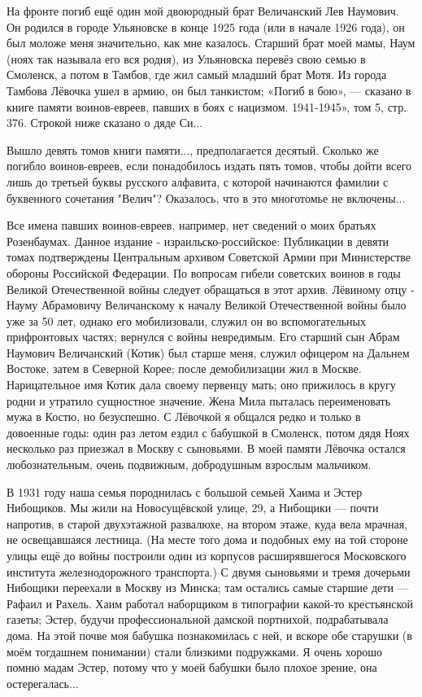 На фронте погиб ещё один мой двоюродный брат Величанский Лев Наумович. Он родился в городе Ульяновске в конце 1925 года (или в начале 1926 года), он был моложе меня значительно, как мне казалось. Старший брат моей мамы, Наум (ноях так называла его вся родня), из Ульяновска перевёз свою семью в Смоленск, а потом в Тамбов, где жил самый младший брат Мотя. Из города Тамбова Лёвочка ушел в армию, он был танкистом; «Погиб в бою», — сказано в книге памяти воинов-евреев, павших в боях с нацизмом. 1941-1945», том 5, стр. 376. Строкой ниже сказано о дяде Си...

Вышло девять томов книги памяти..., предполагается десятый. Сколько же погибло воинов-евреев, если понадобилось издать пять томов, чтобы дойти всего лишь до третьей буквы русского алфавита, с которой начинаются фамилии с буквенного сочетания "Велич"? Оказалось, что в это многотомье не включены...

Все имена павших воинов-евреев, например, нет сведений о моих братьях Розенбаумах. Данное издание - израильско-российское: Публикации в девяти томах подтверждены Центральным архивом Советской Армии при Министерстве обороны Российской Федерации. По вопросам гибели советских воинов в годы Великой Отечественной войны следует обращаться в этот архив. Лёвиному отцу - Науму Абрамовичу Величанскому к началу Великой Отечественной войны было уже за 50 лет, однако его мобилизовали, служил он во вспомогательных прифронтовых частях; вернулся с войны невредимым. Его старший сын Абрам Наумович Величанский (Котик) был старше меня, служил офицером на Дальнем Востоке, затем в Северной Корее; после демобилизации жил в Москве. Нарицательное имя Котик дала своему первенцу мать; оно прижилось в кругу родни и утратило сущностное значение. Жена Мила пыталась переименовать мужа в Костю, но безуспешно. С Лёвочкой я общался редко и только в довоенные годы: один раз летом ездил с бабушкой в Смоленск, потом дядя Ноях несколько раз приезжал в Москву с сыновьями. В моей памяти Лёвочка остался любознательным, очень подвижным, добродушным взрослым мальчиком.

В 1931 году наша семья породнилась с большой семьей Хаима и Эстер Нибощиков. Мы жили на Новосущёвской улице, 29, а Нибощики — почти напротив, в старой двухэтажной развалюхе, на втором этаже, куда вела мрачная, не освещавшаяся лестница. (На месте того дома и подобных ему на той стороне улицы ещё до войны построили один из корпусов расширявшегося Московского института железнодорожного транспорта.) С двумя сыновьями и тремя дочерьми Нибощики переехали в Москву из Минска; там остались самые старшие дети — Рафаил и Рахель. Хаим работал наборщиком в типографии какой-то крестьянской газеты; Эстер, будучи профессиональной дамской портнихой, подрабатывала дома. На этой почве моя бабушка познакомилась с ней, и вскоре обе старушки (в моём тогдашнем понимании) стали близкими подружками. Я очень хорошо помню мадам Эстер, потому что у моей бабушки было плохое зрение, она остерегалась...

